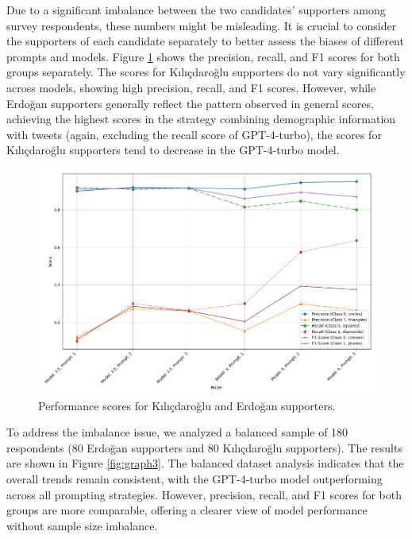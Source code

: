 \documentclass[sigconf,natbib=false]{acmart}
\begin{document}
Due to a significant imbalance between the two candidates' supporters among survey respondents, these numbers might be misleading. It is crucial to consider the supporters of each candidate separately to better assess the biases of different prompts and models. Figure \ref{fig:graph2} shows the precision, recall, and F1 scores for both groups separately. The scores for Kılıçdaroğlu supporters do not vary significantly across models, showing high precision, recall, and F1 scores. However, while Erdoğan supporters generally reflect the pattern observed in general scores, achieving the highest scores in the strategy combining demographic information with tweets (again, excluding the recall score of GPT-4-turbo), the scores for Kılıçdaroğlu supporters tend to decrease in the GPT-4-turbo model.

\begin{figure}[ht]
  \centering
  \includegraphics[width=\linewidth]{graph2.png}
  \caption{Performance scores for Kılıçdaroğlu and Erdoğan supporters.}
   \label{fig:graph2}
\end{figure}

To address the imbalance issue, we analyzed a balanced sample of 180 respondents (80 Erdoğan supporters and 80 Kılıçdaroğlu supporters). The results are shown in Figure \ref{fig:graph3}. The balanced dataset analysis indicates that the overall trends remain consistent, with the GPT-4-turbo model outperforming across all prompting strategies. However, precision, recall, and F1 scores for both groups are more comparable, offering a clearer view of model performance without sample size imbalance.
\end{document}
